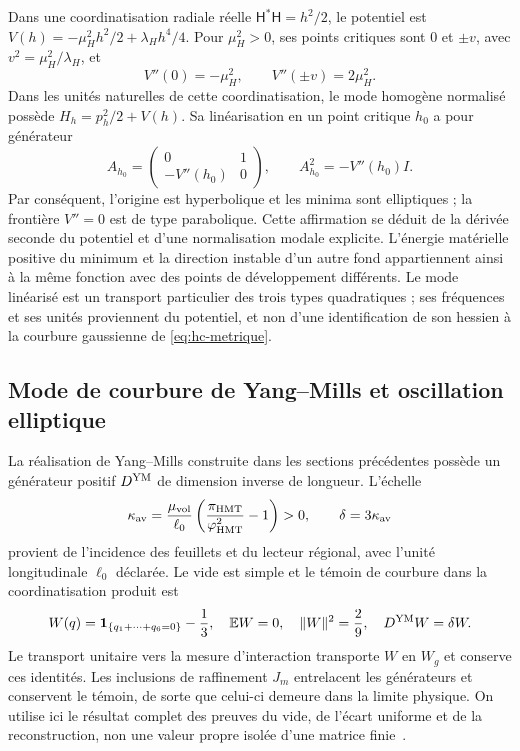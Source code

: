 Dans une coordinatisation radiale réelle \(\mathsf H^*\mathsf H=h^2/2\), le potentiel est \(V(h)=-\mu_H^2h^2/2+\lambda_Hh^4/4\). Pour \(\mu_H^2>0\), ses points critiques sont \(0\) et \(\pm v\), avec \(v^2=\mu_H^2/\lambda_H\), et
\[
 V''(0)=-\mu_H^2,\qquad V''(\pm v)=2\mu_H^2.
\]
Dans les unités naturelles de cette coordinatisation, le mode homogène normalisé possède \(H_h=p_h^2/2+V(h)\). Sa linéarisation en un point critique \(h_0\) a pour générateur
\[
 A_{h_0}=\begin{pmatrix}0&1\\-V''(h_0)&0\end{pmatrix},
 \qquad A_{h_0}^2=-V''(h_0)I.
\]
Par conséquent, l'origine est hyperbolique et les minima sont elliptiques ; la frontière \(V''=0\) est de type parabolique. Cette affirmation se déduit de la dérivée seconde du potentiel et d'une normalisation modale explicite. L'énergie matérielle positive du minimum et la direction instable d'un autre fond appartiennent ainsi à la même fonction avec des points de développement différents. Le mode linéarisé est un transport particulier des trois types quadratiques ; ses fréquences et ses unités proviennent du potentiel, et non d'une identification de son hessien à la courbure gaussienne de \eqref{eq:hc-metrique}.

\subsection{Mode de courbure de Yang--Mills et oscillation elliptique}

La réalisation de Yang--Mills construite dans les sections précédentes
possède un générateur positif \(D^{\rm YM}\) de dimension inverse de
longueur. L’échelle
\[
 \kappa_{\rm av}=\frac{\mu_{\rm vol}}{\ell_0}
 \left(\frac{\pi_{\rm HMT}}{\varphi_{\rm HMT}^2}-1\right)>0,
 \qquad \delta=3\kappa_{\rm av}
\]
provient de l'incidence des feuillets et du lecteur régional, avec l'unité longitudinale \(\ell_0\) déclarée. Le vide est simple et le témoin de courbure dans la coordinatisation produit est
\[
 W(q)=\mathbf1_{\{q_1+\cdots+q_6=0\}}-\frac13,
 \quad \mathbb EW=0,\quad \|W\|^2=\frac29,
 \quad D^{\rm YM}W=\delta W.
\]
Le transport unitaire vers la mesure d’interaction transporte \(W\) en
\(W_g\) et conserve ces identités. Les inclusions de raffinement
\(J_m\) entrelacent les générateurs et conservent le témoin, de sorte que
celui-ci demeure dans la limite physique. On utilise ici le résultat complet
des preuves du vide, de l’écart uniforme et de la reconstruction, non une
valeur propre isolée d’une matrice finie~\cite{HMT-YM}.

